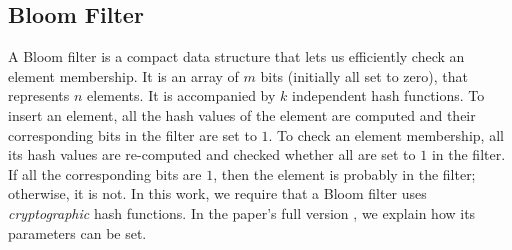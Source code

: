 \vspace{-2.4mm}
\subsection{Bloom Filter}
\vspace{-1mm}

A Bloom filter \cite{DBLP:journals/cacm/Bloom70} is a compact data structure that lets us  
efficiently check an element membership. It is an array of $m$ bits (initially all set to zero), that represents $n$  elements. It is accompanied by $k$ independent hash functions. To insert an element, all the hash values of the element are computed and their corresponding bits in the filter are set to $1$. To check an element membership, all its hash values are re-computed and checked whether all are set to $1$ in the filter. If all the corresponding bits are $1$, then the element is probably in the filter; otherwise, it is not. In this work,  we require that a Bloom filter uses \emph{cryptographic} hash functions. In the paper's full version \cite{PwDR-full-ver}, we explain how its parameters can be set.








%

 

%

